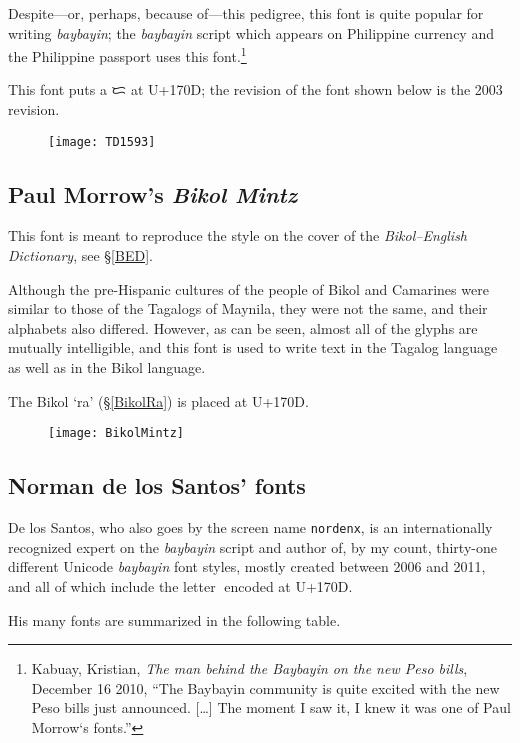 \documentclass[a4paper,pagesize,openany,14pt,parskip=never]{scrbook}
\newcommand{\≈}{$\approx$}
\newcommand{\ra}{{\baybayin ᜍ}}
\begin{document}
Despite---or, perhaps, because of---this pedigree, this font is quite popular for writing {\em baybayin}; the {\em baybayin} script which appears on Philippine currency and the Philippine passport uses this font.\footnote{Kabuay, Kristian, {\em The man behind the Baybayin on the new Peso bills}, December 16 2010, ``The Baybayin community is quite excited with the new Peso bills just announced. [\ldots] The moment I saw it, I knew it was one of Paul Morrow‘s fonts.''}

This font puts a {\baybayin ᜇ} at U+170D; the revision of the font shown below is the 2003 revision.

\begin{figure}[H]
\texttt{[image: TD1593]}
\end{figure}

\subsection{Paul Morrow's {\em Bikol Mintz}}

This font is meant to reproduce the style on the cover of the {\em Bikol--English Dictionary}, see \S\ref{BED}.

Although the pre-Hispanic cultures of the people of Bikol and Camarines were similar to those of the Tagalogs of Maynila, they were not the same, and their alphabets also differed. However, as can be seen, almost all of the glyphs are mutually intelligible, and this font is used to write text in the Tagalog language as well as in the Bikol language.

The Bikol `ra' (\S\ref{BikolRa}) is placed at U+170D.

\begin{figure}[H]
\texttt{[image: BikolMintz]}
\end{figure}

\subsection{Norman de los Santos' fonts}
\label{Nordenx}

De los Santos, who also goes by the screen name \texttt{nordenx}, is an internationally recognized expert on the {\em baybayin} script and author of, by my count, thirty-one different Unicode {\em baybayin} font styles, mostly created between 2006 and 2011, and all of which include the letter \ra encoded at U+170D.

His many fonts are summarized in the following table.
\end{document}
